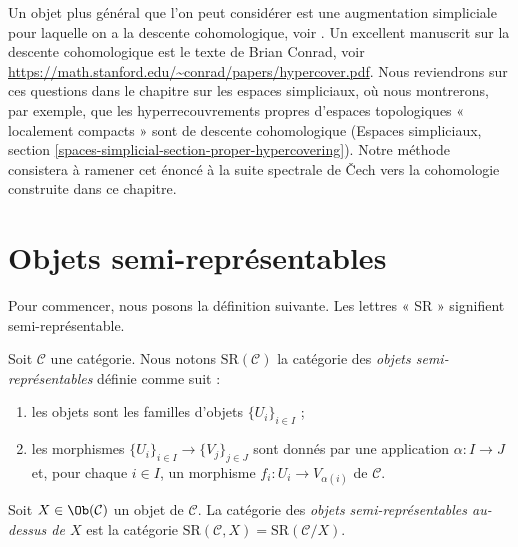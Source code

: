 \medskip\noindent
Un objet plus général que l'on peut considérer est une augmentation simpliciale pour laquelle
on a la descente cohomologique, voir \cite[Expos\'e Vbis]{SGA4}. Un excellent
manuscrit sur la descente cohomologique est le texte de Brian Conrad, voir
\url{https://math.stanford.edu/~conrad/papers/hypercover.pdf}.
Nous reviendrons sur ces questions dans le chapitre sur les espaces simpliciaux,
où nous montrerons, par exemple, que les hyperrecouvrements propres d'espaces
topologiques « localement compacts » sont de descente
cohomologique (Espaces simpliciaux, section
\ref{spaces-simplicial-section-proper-hypercovering}).
Notre méthode consistera à ramener cet énoncé à la suite spectrale de {\v C}ech vers
la cohomologie construite dans ce chapitre.






























\section{Objets semi-représentables}
\label{section-semi-representable}

\noindent
Pour commencer, nous posons la définition suivante.
Les lettres « SR » signifient semi-représentable.

\begin{definition}
\label{definition-SR}
Soit $\mathcal{C}$ une catégorie. Nous notons $\text{SR}(\mathcal{C})$
la catégorie des {\it objets semi-représentables} définie comme suit :
\begin{enumerate}
\item les objets sont les familles d'objets $\{U_i\}_{i \in I}$ ;
\item les morphismes $\{U_i\}_{i \in I} \to \{V_j\}_{j \in J}$ sont donnés par
une application $\alpha : I \to J$ et, pour chaque $i \in I$,
un morphisme $f_i : U_i \to V_{\alpha(i)}$ de $\mathcal{C}$.
\end{enumerate}
Soit $X \in \Ob(\mathcal{C})$ un objet de $\mathcal{C}$.
La catégorie des {\it objets semi-représentables au-dessus de $X$}
est la catégorie
$\text{SR}(\mathcal{C}, X) = \text{SR}(\mathcal{C}/X)$.
\end{definition}

